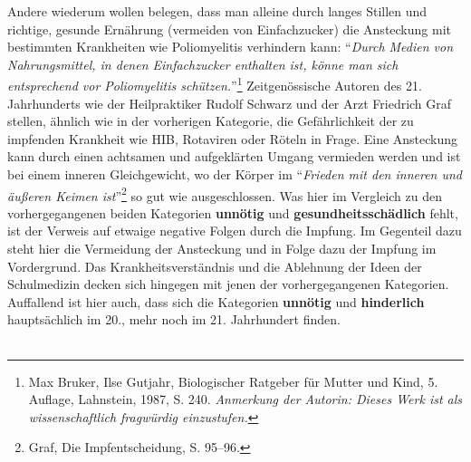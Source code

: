 \documentclass[
    a4paper,
    12pt,
    hyphens,
    chapterprefix=true,
    headheight=33pt,
    footheight=29pt,
    headings=optiontohead, %
]{scrartcl}
\begin{document}
{Andere wiederum wollen belegen, dass man alleine durch langes Stillen und richtige, gesunde Ernährung (vermeiden von Einfachzucker) die Ansteckung mit bestimmten Krankheiten wie Poliomyelitis verhindern kann: "`\textit{Durch Medien von Nahrungsmittel, in denen Einfachzucker enthalten ist, könne man sich entsprechend vor Poliomyelitis schützen.}"'\footnote{Max Bruker, Ilse Gutjahr, Biologischer Ratgeber für Mutter und Kind, 5. Auflage, Lahnstein, 1987, S. 240.  \textit{Anmerkung der Autorin: Dieses Werk ist als wissenschaftlich fragwürdig einzustufen.}} Zeitgenössische Autoren des 21. Jahrhunderts wie der Heilpraktiker Rudolf Schwarz und der Arzt Friedrich Graf stellen, ähnlich wie in der vorherigen Kategorie, die Gefährlichkeit der zu impfenden Krankheit wie HIB, Rotaviren oder Röteln in Frage. Eine Ansteckung kann durch einen achtsamen und aufgeklärten Umgang vermieden werden und ist bei einem inneren Gleichgewicht, wo der Körper im "`\textit{Frieden mit den inneren und äußeren Keimen ist}"'\footnote{Graf, Die Impfentscheidung, S. 95--96.} so gut wie ausgeschlossen. Was hier im Vergleich zu den vorhergegangenen beiden Kategorien \textbf{unnötig} und \textbf{gesundheitsschädlich} fehlt, ist der Verweis auf etwaige negative Folgen durch die Impfung. Im Gegenteil dazu steht hier die Vermeidung der Ansteckung und in Folge dazu der Impfung im Vordergrund. Das Krankheitsverständnis und die Ablehnung der Ideen der Schulmedizin decken sich hingegen mit jenen der vorhergegangenen Kategorien. Auffallend ist hier auch, dass sich die Kategorien \textbf{unnötig} und \textbf{hinderlich}  hauptsächlich im 20., mehr noch im 21. Jahrhundert finden. \\
\\
}
\end{document}
